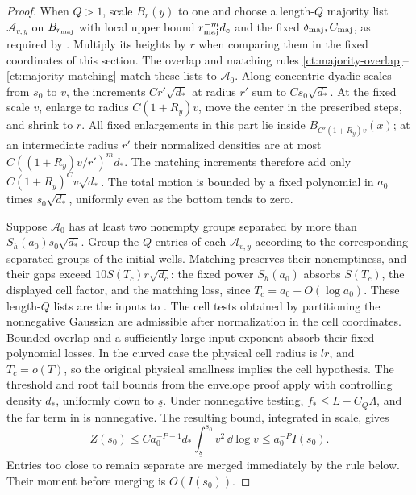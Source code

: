 \begin{proof}
When \(Q>1\), scale \(B_r(y)\) to one and choose a length-\(Q\)
majority list \(\mathcal A_{v,y}\) on \(B_{r_{\rm maj}}\) with local
upper bound \(r_{\rm maj}^{-m}d_c\) and the fixed
\(\delta_{\rm maj},C_{\rm maj}\), as required by
. Multiply its heights by \(r\) when comparing
them in the fixed coordinates of this section. The overlap and
matching rules \eqref{ct:majority-overlap}--\eqref{ct:majority-matching}
match these lists to \(\mathcal A_0\). Along concentric dyadic scales
from \(s_0\) to \(v\), the increments \(Cr'\sqrt{d_*}\) at radius
\(r'\) sum to \(Cs_0\sqrt{d_*}\). At the fixed scale \(v\), enlarge
to radius \(C(1+R_y)v\), move the center in the prescribed steps,
and shrink to \(r\). All fixed enlargements in this part lie inside
\(B_{C'(1+R_y)v}(x)\); at an intermediate radius \(r'\) their
normalized densities are at most
\(C((1+R_y)v/r')^m d_*\). The matching increments therefore add
only \(C(1+R_y)^C v\sqrt{d_*}\). The total motion is bounded by a
fixed polynomial in \(a_0\) times \(s_0\sqrt{d_*}\), uniformly even
as the bottom tends to zero.

Suppose \(\mathcal A_0\) has at least two nonempty groups separated
by more than \(S_h(a_0)s_0\sqrt{d_*}\). Group the \(Q\) entries of
each \(\mathcal A_{v,y}\) according to the corresponding separated
groups of the initial wells. Matching preserves their nonemptiness,
and their gaps exceed \(10S(T_c)r\sqrt{d_c}\): the fixed power
\(S_h(a_0)\) absorbs \(S(T_c)\), the displayed cell factor, and the
matching loss, since \(T_c=a_0-O(\log a_0)\). These length-\(Q\)
lists are the inputs to . The cell tests obtained
by partitioning the nonnegative Gaussian are admissible after
normalization in the cell coordinates. Bounded overlap and a
sufficiently large input exponent absorb their fixed polynomial
losses. In the curved case the physical cell radius is \(lr\),
and \(T_c=o(T)\), so the original physical smallness implies the
cell hypothesis. The threshold and root tail bounds from the
envelope proof apply with controlling density \(d_*\), uniformly
down to \(\underline s\). Under nonnegative testing,
\(f_*\le L-C_Q\Lambda\), and the far term in
 is nonnegative. The resulting bound, integrated
in scale, gives
\[
 Z(s_0)\le Ca_0^{-P-1}d_*
           \int_{\underline s}^{s_0}v^2\,\dd\log v
 \le a_0^{-P}I(s_0).
\]
Entries too close to remain separate are merged immediately by the
rule below. Their moment before merging is \(O(I(s_0))\).


\end{proof}
